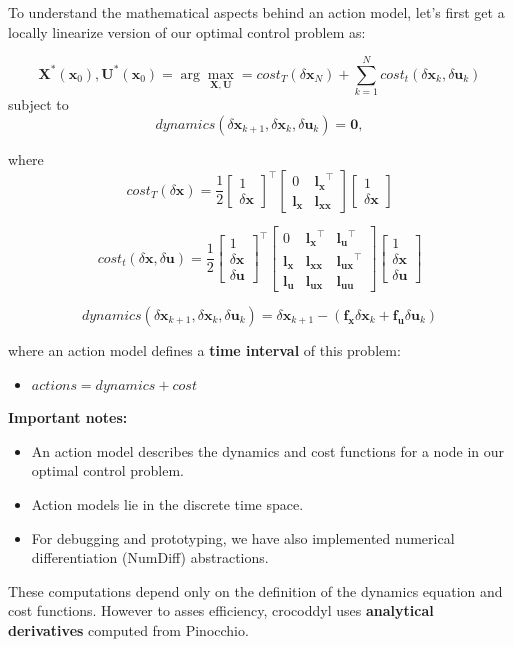 To understand the mathematical aspects behind an action model, let's first get a locally linearize version of our optimal control problem as:

$$\mathbf{X}^*(\mathbf{x}_0),\mathbf{U}^*(\mathbf{x}_0)
=
\arg\max_{\mathbf{X},\mathbf{U}} = cost_T(\delta\mathbf{x}_N) + \sum_{k=1}^N cost_t(\delta\mathbf{x}_k, \delta\mathbf{u}_k)$$
subject to
$$dynamics(\delta\mathbf{x}_{k+1},\delta\mathbf{x}_k,\delta\mathbf{u}_k)=\mathbf{0},$$

where
$$cost_T(\delta\mathbf{x}) = \frac{1}{2}
\begin{bmatrix} 
  1 \\ \delta\mathbf{x}
\end{bmatrix}^\top
\begin{bmatrix}
0 & \mathbf{l_x}^\top \\
\mathbf{l_x} & \mathbf{l_{xx}}
\end{bmatrix}
\begin{bmatrix}
  1 \\ \delta\mathbf{x}
\end{bmatrix}
$$

$$cost_t(\delta\mathbf{x},\delta\mathbf{u}) = \frac{1}{2}
\begin{bmatrix} 
  1 \\ \delta\mathbf{x} \\ \delta\mathbf{u}
\end{bmatrix}^\top
\begin{bmatrix}
0 & \mathbf{l_x}^\top & \mathbf{l_u}^\top\\
\mathbf{l_x} & \mathbf{l_{xx}} & \mathbf{l_{ux}}^\top\\
\mathbf{l_u} & \mathbf{l_{ux}} & \mathbf{l_{uu}}
\end{bmatrix}
\begin{bmatrix}
  1 \\ \delta\mathbf{x} \\ \delta\mathbf{u}
\end{bmatrix}
$$

$$
dynamics(\delta\mathbf{x}_{k+1},\delta\mathbf{x}_k,\delta\mathbf{u}_k) = \delta\mathbf{x}_{k+1} - (\mathbf{f_x}\delta\mathbf{x}_k + \mathbf{f_u}\delta\mathbf{u}_k)
$$

where an action model defines a \textbf{time interval} of this problem:
\begin{itemize}
\item $actions = dynamics + cost$
\end{itemize}

\textbf{Important notes:}
\begin{itemize}
\item An action model describes the dynamics and cost functions for a node in our optimal control problem.
\item Action models lie in the discrete time space.
\item For debugging and prototyping, we have also implemented numerical differentiation (NumDiff) abstractions.
\end{itemize}
 These computations depend only on the definition of the dynamics equation and cost functions. However to asses efficiency, crocoddyl uses \textbf{analytical derivatives} computed from Pinocchio.
 
